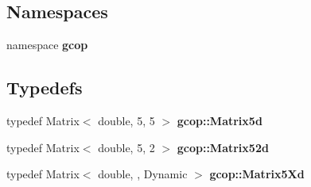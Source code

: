 \subsection*{\-Namespaces}
\begin{DoxyCompactItemize}
\item 
namespace {\bf gcop}
\end{DoxyCompactItemize}
\subsection*{\-Typedefs}
\begin{DoxyCompactItemize}
\item 
typedef \-Matrix$<$ double, 5, 5 $>$ {\bf gcop\-::\-Matrix5d}
\item 
typedef \-Matrix$<$ double, 5, 2 $>$ {\bf gcop\-::\-Matrix52d}
\item 
typedef \-Matrix$<$ double, , \-Dynamic $>$ {\bf gcop\-::\-Matrix5\-Xd}
\end{DoxyCompactItemize}
